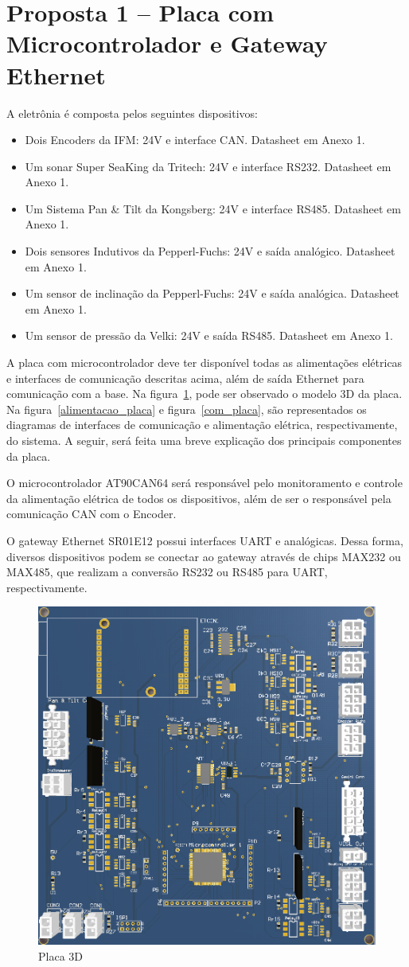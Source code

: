 \section{Proposta 1 – Placa com Microcontrolador e Gateway Ethernet}

A eletrônia é composta pelos seguintes dispositivos:
\begin{itemize}
  \item Dois Encoders da IFM: 24V e interface CAN. Datasheet em Anexo 1.
  \item Um sonar Super SeaKing da Tritech: 24V e interface RS232. Datasheet em
  Anexo 1.
  \item Um Sistema Pan & Tilt da Kongsberg: 24V e interface RS485. Datasheet em
  Anexo 1.
  \item Dois sensores Indutivos da Pepperl-Fuchs: 24V e saída analógico.
  Datasheet em Anexo 1.
  \item Um sensor de inclinação da Pepperl-Fuchs: 24V e saída analógica.
  Datasheet em Anexo 1.
  \item Um sensor de pressão da Velki: 24V e saída RS485. Datasheet em Anexo 1.
\end{itemize}	

A placa com microcontrolador deve ter disponível todas as alimentações elétricas
e interfaces de comunicação descritas acima, além de saída Ethernet para
comunicação com a base. Na figura~\ref{placa}, pode ser observado o modelo 3D da
placa. Na figura~\ref{alimentacao_placa} e figura~\ref{com_placa}, são
representados os diagramas de interfaces de comunicação e alimentação elétrica, respectivamente, do sistema. A seguir, será feita uma breve explicação dos principais componentes da placa.

O microcontrolador AT90CAN64 será responsável pelo monitoramento e controle da alimentação elétrica de todos os dispositivos, além de ser o responsável pela comunicação CAN com o Encoder. 

O gateway Ethernet SR01E12 possui interfaces UART e analógicas. Dessa forma, diversos dispositivos podem se conectar ao gateway através de chips MAX232 ou MAX485, que realizam a conversão RS232 ou RS485 para UART, respectivamente.
  
\begin{figure}[H]
    \centering
    \includegraphics[width=0.5\columnwidth]{figs/eletronica/1.png}
    \caption{Placa 3D}
    \label{placa}
\end{figure}

